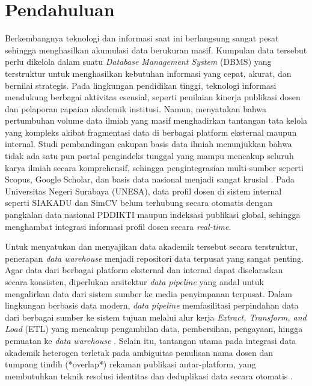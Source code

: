\documentclass{rapidsart}
\theoremstyle{plain}
\theoremstyle{remark}
\theoremstyle{definition}
\begin{document}
\section{Pendahuluan}
\begin{sloppypar}
    Berkembangnya teknologi dan informasi saat ini berlangsung sangat pesat sehingga menghasilkan akumulasi data berukuran masif. Kumpulan data tersebut perlu dikelola dalam suatu \textit{Database Management System} (DBMS) yang terstruktur untuk menghasilkan kebutuhan informasi yang cepat, akurat, dan bernilai strategis. Pada lingkungan pendidikan tinggi, teknologi informasi mendukung berbagai aktivitas esensial, seperti penilaian kinerja publikasi dosen dan pelaporan capaian akademik institusi. Namun, \cite{setiawan2022pddikti} menyatakan bahwa pertumbuhan volume data ilmiah yang masif menghadirkan tantangan tata kelola yang kompleks akibat fragmentasi data di berbagai platform eksternal maupun internal. Studi pembandingan cakupan basis data ilmiah menunjukkan bahwa tidak ada satu pun portal pengindeks tunggal yang mampu mencakup seluruh karya ilmiah secara komprehensif, sehingga pengintegrasian multi-sumber seperti Scopus, Google Scholar, dan basis data nasional menjadi sangat krusial \citep{visser2021comparison, MartínMartín2021}. Pada Universitas Negeri Surabaya (UNESA), data profil dosen di sistem internal seperti SIAKADU dan SimCV belum terhubung secara otomatis dengan pangkalan data nasional PDDIKTI maupun indeksasi publikasi global, sehingga menghambat integrasi informasi profil dosen secara \textit{real-time}.

    Untuk menyatukan dan menyajikan data akademik tersebut secara terstruktur, penerapan \textit{data warehouse} menjadi repositori data terpusat yang sangat penting. Agar data dari berbagai platform eksternal dan internal dapat diselaraskan secara konsisten, diperlukan arsitektur \textit{data pipeline} yang andal untuk mengalirkan data dari sistem sumber ke media penyimpanan terpusat. Dalam lingkungan berbasis data modern, \textit{data pipeline} memfasilitasi perpindahan data dari berbagai sumber ke sistem tujuan melalui alur kerja \textit{Extract, Transform, and Load} (ETL) yang mencakup pengambilan data, pembersihan, pengayaan, hingga pemuatan ke \textit{data warehouse} \citep{shojaeegrad2024data}. Selain itu, tantangan utama pada integrasi data akademik heterogen terletak pada ambiguitas penulisan nama dosen dan tumpang tindih (*overlap*) rekaman publikasi antar-platform, yang membutuhkan teknik resolusi identitas dan deduplikasi data secara otomatis \citep{tekles2020author}.


\end{sloppypar}
\end{document}
